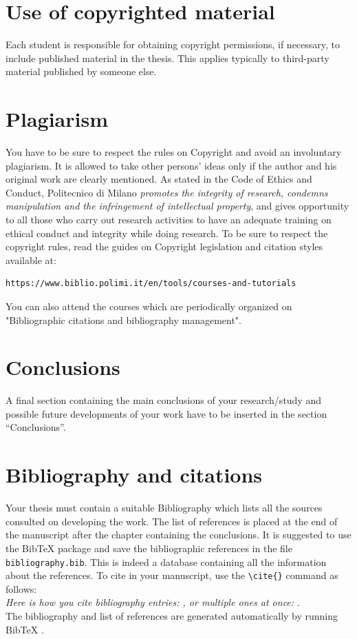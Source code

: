 \documentclass[11pt,a4paper]{article}
\begin{document}
\section{Use of copyrighted material}

Each student is responsible for obtaining copyright permissions, if necessary, to include published material in the thesis.
This applies typically to third-party material published by someone else.

\section{Plagiarism}

You have to be sure to respect the rules on Copyright and avoid an involuntary plagiarism.
It is allowed to take other persons' ideas only if the author and his original work are clearly mentioned.
As stated in the Code of Ethics and Conduct, Politecnico di Milano \textit{promotes the integrity of research,
    condemns manipulation and the infringement of intellectual property}, and gives opportunity to all those
who carry out research activities to have an adequate training on ethical conduct and integrity while doing research.
To be sure to respect the copyright rules, read the guides on Copyright legislation and citation styles available
at:
\begin{verbatim}
https://www.biblio.polimi.it/en/tools/courses-and-tutorials
\end{verbatim}
You can also attend the courses which are periodically organized on "Bibliographic citations and bibliography management".

\section{Conclusions}
\color{black}
A final section containing the main conclusions of your research/study
and possible future developments of your work have to be inserted in the section ``Conclusions''.

\section{Bibliography and citations}
Your thesis must contain a suitable Bibliography which lists all the sources consulted on developing the work.
The list of references is placed at the end of the manuscript after the chapter containing the conclusions.
It is suggested to use the BibTeX package and save the bibliographic references in the file \verb|bibliography.bib|.
This is indeed a database containing all the information about the references. To cite in your manuscript, use the \verb|\cite{}| command as follows:
\\
\textit{Here is how you cite bibliography entries: \cite{knuth74}, or multiple ones at once: \cite{knuth92,lamport94}}.
\\
The bibliography and list of references are generated automatically by running BibTeX \cite{bibtex}.
\end{document}
